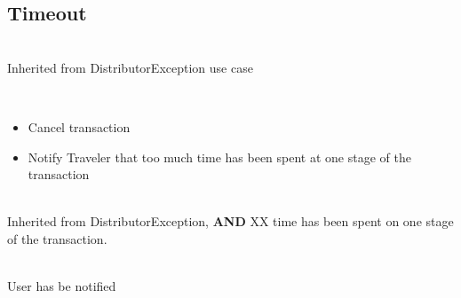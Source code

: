 \subsection{Timeout}


 \\
Inherited from DistributorException use case
\\

 \\
\begin{itemize}

\item Cancel transaction
\item Notify Traveler that too much time has been spent at one stage of the transaction

\end{itemize}

 \\
Inherited from DistributorException, \textbf{AND} XX time has been spent on one stage of the transaction.
\\

 \\
User has be notified
\\
